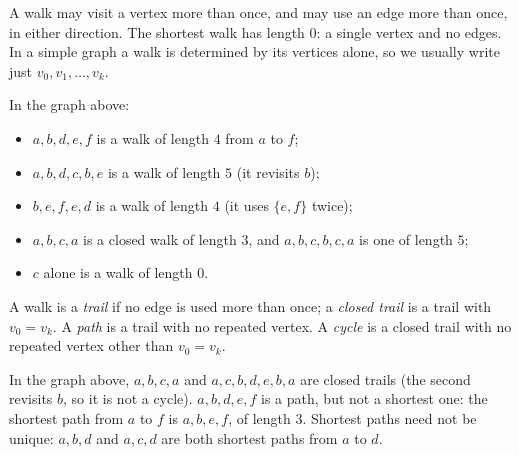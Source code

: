 \begin{note}
A walk may visit a vertex more than once, and may use an edge more than once, in either direction. The shortest walk has length $0$: a single vertex and no edges. In a simple graph a walk is determined by its vertices alone, so we usually write just $v_0,v_1,\dots,v_k$.
\end{note}

\begin{center}
\end{center}

\begin{example}
In the graph above:
\begin{itemize}
    \item $a,b,d,e,f$ is a walk of length $4$ from $a$ to $f$;
    \item $a,b,d,c,b,e$ is a walk of length $5$ (it revisits $b$);
    \item $b,e,f,e,d$ is a walk of length $4$ (it uses $\{e,f\}$ twice);
    \item $a,b,c,a$ is a closed walk of length $3$, and $a,b,c,b,c,a$ is one of length $5$;
    \item $c$ alone is a walk of length $0$.
\end{itemize}
\end{example}

\begin{definition}
\label{def:trail-path-cycle}
A walk is a \emph{trail} if no edge is used more than once; a \emph{closed trail} is a trail with $v_0=v_k$. A \emph{path} is a trail with no repeated vertex. A \emph{cycle} is a closed trail with no repeated vertex other than $v_0=v_k$.
\end{definition}

\begin{example}
In the graph above, $a,b,c,a$ and $a,c,b,d,e,b,a$ are closed trails (the second revisits $b$, so it is not a cycle). $a,b,d,e,f$ is a path, but not a shortest one: the shortest path from $a$ to $f$ is $a,b,e,f$, of length $3$. Shortest paths need not be unique: $a,b,d$ and $a,c,d$ are both shortest paths from $a$ to $d$.
\end{example}

